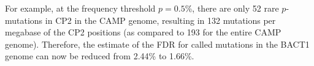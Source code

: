 For example, at the frequency threshold $p=0.5$\%, there are only 52 rare $p$-mutations in CP2 in the CAMP genome, resulting in 132 mutations per megabase of the CP2 positions (as compared to 193 for the entire CAMP genome). Therefore, the estimate of the FDR for called mutations in the BACT1 genome can now be reduced from 2.44\% to 1.66\%.\endinput